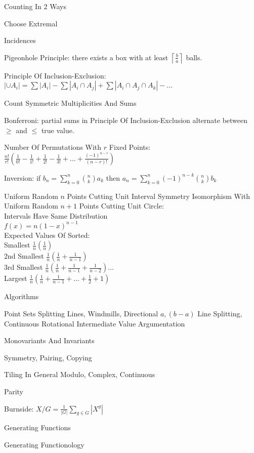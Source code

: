 Counting In $2$ Ways

Choose Extremal

Incidences

Pigeonhole Principle: there exists a box with at least $\left\lceil \frac{b}{a} \right\rceil$ balls.

Principle Of Inclusion-Exclusion: $| \cup A_i | = \sum |A_i| - \sum |A_i \cap A_j| + \sum |A_i \cap A_j \cap A_k| - \dots$

Count Symmetric Multiplicities And Sums

Bonferroni: partial sums in Principle Of Inclusion-Exclusion alternate between $\ge$ and $\le$ true value.

Number Of Permutations With $r$ Fixed Points: $\frac{n!}{r!}(\frac{1}{0!} - \frac{1}{1!} + \frac{1}{2!} - \frac{1}{3!} + \dots + \frac{(-1)^{n-r}}{(n-r)!})$

Inversion: if $b_n = \sum_{k=0}^n \binom{n}{k} a_k$ then $a_n = \sum_{k=0}^n (-1)^{n-k} \binom{n}{k} b_k$

Uniform Random $n$ Points Cutting Unit Interval Symmetry Isomorphism With Uniform Random $n+1$ Points Cutting Unit Circle: \\
Intervals Have Same Distribution \\
$f(x)=n(1-x)^{n-1}$ \\
Expected Values Of Sorted: \\
Smallest $\frac{1}{n} \left(\frac{1}{n} \right)$ \\
$2$nd Smallest $\frac{1}{n} \left(\frac{1}{n}+\frac{1}{n-1} \right)$ \\
$3$rd Smallest $\frac{1}{n} \left(\frac{1}{n}+\frac{1}{n-1}+\frac{1}{n-2} \right) \dots$ \\
Largest $\frac{1}{n} \left(\frac{1}{n}+\frac{1}{n-1}+\dots+\frac{1}{2}+1 \right)$

Algorithms

Point Sets Splitting Lines, Windmills, Directional $a,(b-a)$ Line Splitting, Continuous Rotational Intermediate Value Argumentation

Monovariants And Invariants

Symmetry, Pairing, Copying

Tiling In General Modulo, Complex, Continuous

Parity

Burnside: $X / G = \frac{1}{|G|} \sum_{g \in G} |X^g|$

Generating Functions

Generating Functionology

